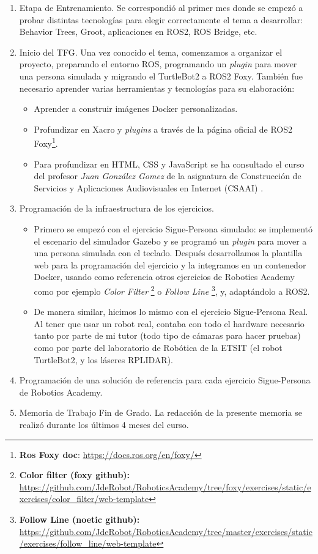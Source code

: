 \begin{enumerate}
	\item Etapa de Entrenamiento. Se correspondió al primer mes donde se empezó a probar distintas tecnologías para elegir correctamente el tema a desarrollar: Behavior Trees, Groot, aplicaciones en ROS2, ROS Bridge, etc.
	\item Inicio del TFG. Una vez conocido el tema, comenzamos a organizar el proyecto, preparando el entorno ROS, programando un \textit{plugin} para mover una persona simulada y migrando el TurtleBot2 a ROS2 Foxy. También fue necesario aprender varias herramientas y tecnologías para su elaboración:
	\begin{itemize}
		\item Aprender a construir imágenes Docker personalizadas.
		\item Profundizar en Xacro y \textit{plugins} a través de la página oficial de ROS2 Foxy\footnote{\textbf{Ros Foxy doc}: \url{https://docs.ros.org/en/foxy/}}.
		\item Para profundizar en HTML, CSS y JavaScript se ha consultado el curso del profesor \textit{Juan González Gomez} de la asignatura de Construcción de Servicios y Aplicaciones Audiovisuales en Internet (CSAAI) \cite{CSAAI}.
	\end{itemize}
	\item Programación de la infraestructura de los ejercicios.
	\begin{itemize}
		\item Primero se empezó con el ejercicio Sigue-Persona simulado: se implementó el escenario del simulador Gazebo y se programó un \textit{plugin} para mover a una persona simulada con el teclado. Después desarrollamos la plantilla web para la programación del ejercicio y la integramos en un contenedor Docker, usando como referencia otros ejercicios de Robotics Academy como por ejemplo \textit{Color Filter} \footnote{\textbf{Color filter (foxy github):} \url{https://github.com/JdeRobot/RoboticsAcademy/tree/foxy/exercises/static/exercises/color_filter/web-template}} o \textit{Follow Line} \footnote{\textbf{Follow Line (noetic github):} \url{https://github.com/JdeRobot/RoboticsAcademy/tree/master/exercises/static/exercises/follow_line/web-template}}, y, adaptándolo a ROS2.
		\item De manera similar, hicimos lo mismo con el ejercicio Sigue-Persona Real. Al tener que usar un robot real, contaba con todo el hardware necesario tanto por parte de mi tutor (todo tipo de cámaras para hacer pruebas) como por parte del laboratorio de Robótica de la ETSIT (el robot TurtleBot2, y los láseres RPLIDAR).
	\end{itemize}
	\item Programación de una solución de referencia para cada ejercicio Sigue-Persona de Robotics Academy.
	\item Memoria de Trabajo Fin de Grado. La redacción de la presente memoria se realizó durante los últimos 4 meses del curso. 
\end{enumerate}


